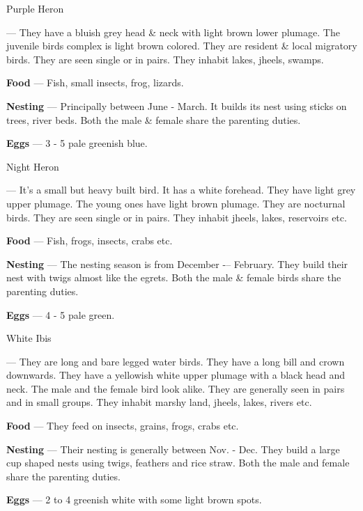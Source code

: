 \begin{bird}{Purple Heron}

 --- They have a bluish grey head \& neck with light brown lower plumage. The juvenile birds complex is light brown colored. They are resident \& local migratory birds. They are seen single or in pairs. They inhabit lakes, jheels, swamps.

{\large\bf Food} --- Fish, small insects, frog, lizards.

{\large\bf Nesting} --- Principally between June - March. It builds its nest using sticks on trees, river beds. Both the male \& female share the parenting duties.

{\large\bf Eggs} --- 3 - 5 pale greenish blue.
\end{bird}

\begin{bird}{Night Heron}

 --- It's a small but heavy built bird. It has a white forehead. They have light grey upper plumage. The young ones have light brown plumage. They are nocturnal birds. They are seen single or in pairs. They inhabit jheels, lakes, reservoirs etc.

{\large\bf Food} --- Fish, frogs, insects, crabs etc.

{\large\bf Nesting} --- The nesting season is from December -– February. They build their nest with twigs almost like the egrets. Both the male \& female birds share the parenting duties.

{\bf Eggs} --- 4 - 5 pale green.
\end{bird}


\begin{bird}{White Ibis}

 --- They are long and bare legged water birds. They have a long bill and crown downwards. They have a yellowish white upper plumage with a black head and neck. The male and the female bird look alike. They are generally seen in pairs and in small groups. They inhabit marshy land, jheels, lakes, rivers etc.

{\large\bf Food} --- They feed on insects, grains, frogs, crabs etc.

{\large\bf Nesting} --- Their nesting is generally between Nov. - Dec. They build a large cup shaped nests using twigs, feathers and rice straw. Both the male and female share the parenting duties. 

{\large\bf Eggs} --- 2 to 4 greenish white with some light brown spots.
\end{bird}


